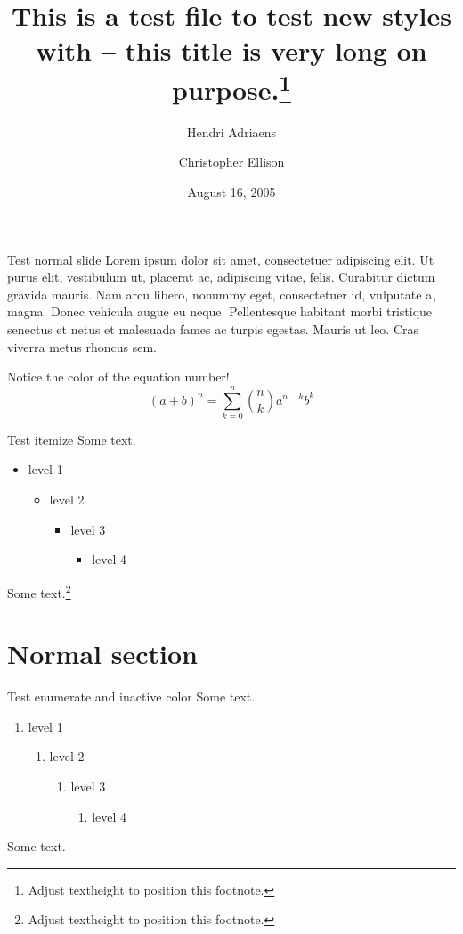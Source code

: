 \documentclass[
  style=your style,
  paper=screen,
  orient=landscape,
  size=11pt,
  clock
]{powerdot}
\title{This is a test file to test new styles with --
this title is very long on purpose.\thanks{Adjust textheight
to position this footnote.}}
\author{Hendri Adriaens \and Christopher Ellison}
\date{August 16, 2005}
\begin{document}
\maketitle

\begin{slide}{Test normal slide}
  Lorem ipsum dolor sit amet, consectetuer adipiscing elit. Ut purus
  elit, vestibulum ut, placerat ac, adipiscing vitae, felis. Curabitur
  dictum gravida mauris. Nam arcu libero, nonummy eget, consectetuer
  id, vulputate a, magna. Donec vehicula augue eu neque. Pellentesque
  habitant morbi tristique senectus et netus et malesuada fames ac
  turpis egestas. Mauris ut leo. Cras viverra metus rhoncus sem.

  Notice the color of the equation number!
  \begin{equation}
    (a+b)^n=\sum_{k=0}^n{n\choose k}a^{n-k}b^k
  \end{equation}
\end{slide}

\begin{slide}{Test itemize}
  Some text.\pause
  \begin{itemize}
    \item level 1\pause
    \begin{itemize}
      \item level 2\pause
      \begin{itemize}
        \item level 3\pause
        \begin{itemize}
          \item level 4
        \end{itemize}
      \end{itemize}
    \end{itemize}
  \end{itemize}
  Some text.\footnote{Adjust textheight
  to position this footnote.}
\end{slide}

\section{Normal section}

\begin{slide}{Test enumerate and inactive color}
  Some text.\pause
  \begin{enumerate}[type=1]
    \item level 1\pause
    \begin{enumerate}
      \item level 2\pause
      \begin{enumerate}
        \item level 3\pause
        \begin{enumerate}
          \item level 4
        \end{enumerate}
      \end{enumerate}
    \end{enumerate}
  \end{enumerate}
  Some text.
\end{slide}
\end{document}
